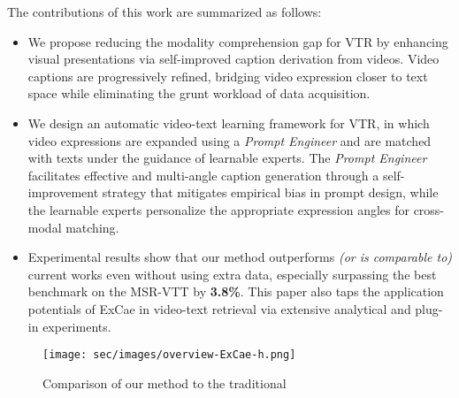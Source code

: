 \noindent The contributions of this work are summarized as follows:
\begin{itemize}
\item We propose reducing the modality comprehension gap for VTR by enhancing visual presentations via self-improved caption derivation from videos. Video captions are progressively refined, bridging video expression closer to text space while eliminating the grunt workload of data acquisition.

\item We design an automatic video-text learning framework for VTR, in which video expressions are expanded using a \textit{Prompt Engineer} and are matched with texts under the guidance of learnable experts. The \textit{Prompt Engineer} facilitates effective and multi-angle caption generation through a self-improvement strategy that mitigates empirical bias in prompt design, while the learnable experts personalize the appropriate expression angles for cross-modal matching. 

\item Experimental results show that our method outperforms \textit{(or is comparable to)} current works even without using extra data, especially surpassing the best benchmark on the MSR-VTT by \textbf{3.8\%}. This paper also taps the application potentials of ExCae in video-text retrieval via extensive analytical and plug-in experiments.
\end{itemize}

\begin{figure}[t]
\centering
\texttt{[image: sec/images/overview-ExCae-h.png]} 
\vspace{-0.5em}
\caption{Comparison of our method to the traditional}
\label{fig:overview}
\end{figure}


